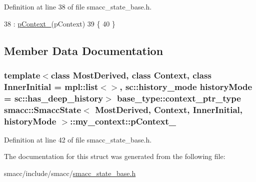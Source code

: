 Definition at line 38 of file smacc\+\_\+state\+\_\+base.\+h.


\begin{DoxyCode}
38                                                             : \hyperlink{structsmacc_1_1SmaccState_1_1my__context_a85f6eff5aba687932efe3f8117be76d3}{pContext\_}(pContext)
39     \{
40     \}
\end{DoxyCode}


\subsection{Member Data Documentation}
\subsubsection[{\texorpdfstring{p\+Context\+\_\+}{pContext_}}]{\setlength{\rightskip}{0pt plus 5cm}template$<$class Most\+Derived, class Context, class Inner\+Initial = mpl\+::list$<$$>$, sc\+::history\+\_\+mode history\+Mode = sc\+::has\+\_\+deep\+\_\+history$>$ base\+\_\+type\+::context\+\_\+ptr\+\_\+type {\bf smacc\+::\+Smacc\+State}$<$ Most\+Derived, Context, Inner\+Initial, history\+Mode $>$\+::my\+\_\+context\+::p\+Context\+\_\+}\hypertarget{structsmacc_1_1SmaccState_1_1my__context_a85f6eff5aba687932efe3f8117be76d3}{}\label{structsmacc_1_1SmaccState_1_1my__context_a85f6eff5aba687932efe3f8117be76d3}


Definition at line 42 of file smacc\+\_\+state\+\_\+base.\+h.



The documentation for this struct was generated from the following file\+:\begin{DoxyCompactItemize}
\item 
smacc/include/smacc/\hyperlink{smacc__state__base_8h}{smacc\+\_\+state\+\_\+base.\+h}\end{DoxyCompactItemize}
